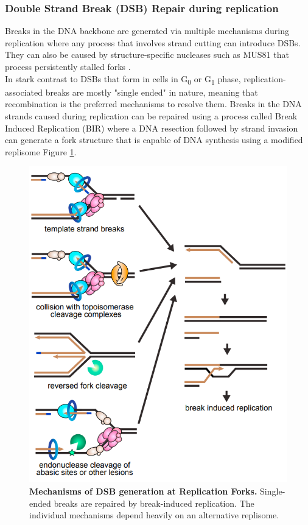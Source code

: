 \subsubsection{Double Strand Break (DSB) Repair during replication}
Breaks in the DNA backbone are generated via multiple mechanisms during replication where any process that involves strand cutting can introduce DSBs. They can also be caused by structure-specific nucleases such as MUS81 that process persistently stalled forks \citep{Hanada.2007}.\\
In stark contrast to DSBs that form in cells in G\textsubscript{0} or G\textsubscript{1} phase, replication-associated breaks are mostly "single ended" in nature, meaning that recombination is the preferred mechanisms to resolve them. Breaks in the DNA strands caused during replication can be repaired using a process called Break Induced Replication (BIR) where a DNA resection followed by strand invasion can generate a fork structure that is capable of DNA synthesis using a modified replisome \see Figure \ref{fig:bir}.
\begin{figure}[H]
    \centering
    \includegraphics[width=.65\textwidth]{resources/images/Intro/bir.PNG}
    \caption[Mechanisms of DSB generation at Replication Forks]{\textbf{Mechanisms of DSB generation at Replication Forks. }Single-ended breaks are repaired by break-induced replication. The individual mechanisms depend heavily on an alternative replisome.\\\citep{Cortez.2019}}
    \label{fig:bir}
\end{figure}
